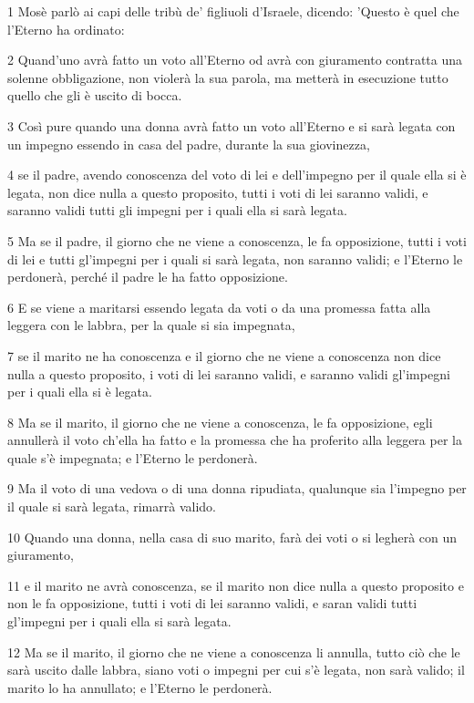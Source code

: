 \par 1 Mosè parlò ai capi delle tribù de' figliuoli d'Israele, dicendo: 'Questo è quel che l'Eterno ha ordinato:
\par 2 Quand'uno avrà fatto un voto all'Eterno od avrà con giuramento contratta una solenne obbligazione, non violerà la sua parola, ma metterà in esecuzione tutto quello che gli è uscito di bocca.
\par 3 Così pure quando una donna avrà fatto un voto all'Eterno e si sarà legata con un impegno essendo in casa del padre, durante la sua giovinezza,
\par 4 se il padre, avendo conoscenza del voto di lei e dell'impegno per il quale ella si è legata, non dice nulla a questo proposito, tutti i voti di lei saranno validi, e saranno validi tutti gli impegni per i quali ella si sarà legata.
\par 5 Ma se il padre, il giorno che ne viene a conoscenza, le fa opposizione, tutti i voti di lei e tutti gl'impegni per i quali si sarà legata, non saranno validi; e l'Eterno le perdonerà, perché il padre le ha fatto opposizione.
\par 6 E se viene a maritarsi essendo legata da voti o da una promessa fatta alla leggera con le labbra, per la quale si sia impegnata,
\par 7 se il marito ne ha conoscenza e il giorno che ne viene a conoscenza non dice nulla a questo proposito, i voti di lei saranno validi, e saranno validi gl'impegni per i quali ella si è legata.
\par 8 Ma se il marito, il giorno che ne viene a conoscenza, le fa opposizione, egli annullerà il voto ch'ella ha fatto e la promessa che ha proferito alla leggera per la quale s'è impegnata; e l'Eterno le perdonerà.
\par 9 Ma il voto di una vedova o di una donna ripudiata, qualunque sia l'impegno per il quale si sarà legata, rimarrà valido.
\par 10 Quando una donna, nella casa di suo marito, farà dei voti o si legherà con un giuramento,
\par 11 e il marito ne avrà conoscenza, se il marito non dice nulla a questo proposito e non le fa opposizione, tutti i voti di lei saranno validi, e saran validi tutti gl'impegni per i quali ella si sarà legata.
\par 12 Ma se il marito, il giorno che ne viene a conoscenza li annulla, tutto ciò che le sarà uscito dalle labbra, siano voti o impegni per cui s'è legata, non sarà valido; il marito lo ha annullato; e l'Eterno le perdonerà.
